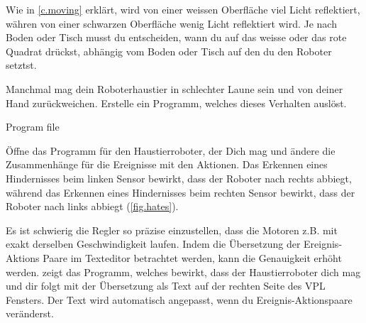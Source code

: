
Wie in \cref{c.moving} erklärt, wird von einer weissen Oberfläche viel Licht reflektiert, währen von einer schwarzen Oberfläche wenig Licht reflektiert wird. Je nach Boden oder Tisch musst du entscheiden,
wann du auf das weisse oder das rote Quadrat drückst,
abhängig vom Boden oder Tisch auf den du den Roboter setztst.




Manchmal mag dein Roboterhaustier in schlechter Laune sein und von deiner Hand zurückweichen. Erstelle ein Programm, welches dieses Verhalten auslöst.

{\raggedleft \hfill Program file }

Öffne das Programm für den Haustierroboter, 
der Dich mag und ändere die Zusammenhänge für die Ereignisse mit den Aktionen. 
Das Erkennen eines Hindernisses beim linken Sensor bewirkt, 
dass der Roboter nach rechts abbiegt, 
während das Erkennen eines Hindernisses beim rechten Sensor bewirkt, 
dass der Roboter nach links abbiegt (\cref{fig.hates}).




Es ist schwierig die Regler so präzise einzustellen, dass die Motoren z.B. mit exakt derselben Geschwindigkeit laufen. Indem die Übersetzung der Ereignis-Aktions Paare im Texteditor betrachtet werden, kann die Genauigkeit erhöht werden.  zeigt das Programm, welches bewirkt, dass der Haustierroboter dich mag und dir folgt mit der Übersetzung als Text auf der rechten Seite des VPL Fensters.
Der Text wird automatisch angepasst, wenn du Ereignis-Aktionspaare veränderst.

